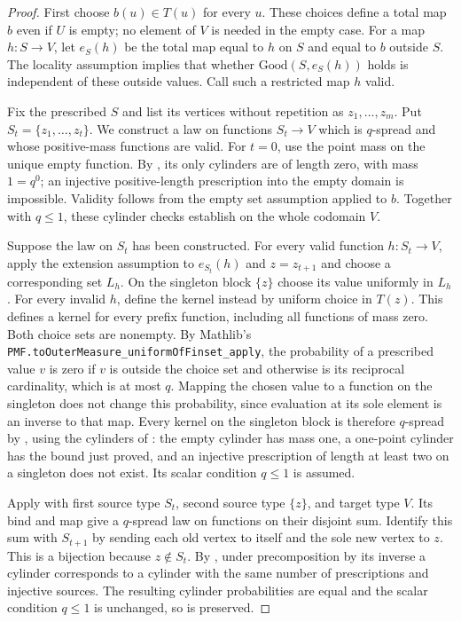 \begin{proof}
First choose $b(u)\in T(u)$ for every $u$. These choices define a total
map $b$ even if $U$ is empty; no element of $V$ is needed in the empty
case. For a map $h:S\to V$, let $e_S(h)$ be the total map equal to
$h$ on $S$ and equal to $b$ outside $S$. The locality assumption
implies that whether $\mathrm{Good}(S,e_S(h))$ holds is independent
of these outside values. Call such a restricted map $h$ valid.

Fix the prescribed $S$ and list its vertices without repetition as
$z_1,\ldots,z_m$. Put $S_t=\{z_1,\ldots,z_t\}$.
We construct a law on functions $S_t\to V$ which is $q$-spread and
whose positive-mass functions are valid. For $t=0$, use the point
mass on the unique empty function. By , its
only cylinders are of length zero, with mass $1=q^0$; an injective
positive-length prescription into the empty domain is impossible.
Validity follows from the empty
set assumption applied to $b$. Together with $q\leq1$, these cylinder
checks establish  on the whole codomain $V$.

Suppose the law on $S_t$ has been constructed. For every valid
function $h:S_t\to V$, apply the extension assumption to
$e_{S_t}(h)$ and $z=z_{t+1}$ and choose a corresponding set $L_h$.
On the singleton block $\{z\}$ choose its value uniformly in $L_h$.
For every invalid $h$, define the kernel instead by uniform choice
in $T(z)$. This defines a kernel for every prefix function, including
all functions of mass zero. Both choice sets are nonempty. By
Mathlib's \texttt{PMF.toOuterMeasure\_uniformOfFinset\_apply}, the probability of a prescribed
value $v$ is zero if $v$ is outside the choice set and otherwise is
its reciprocal cardinality, which is at most $q$. Mapping the chosen
value to a function on the singleton does not change this probability,
since evaluation at its sole element is an inverse to that map.
Every kernel on the singleton block is therefore $q$-spread by
, using the cylinders of :
the empty cylinder has mass one, a one-point cylinder has the bound
just proved, and an injective prescription of length at least two on
a singleton does not exist. Its scalar condition $q\leq1$ is assumed.

Apply  with first source type $S_t$,
second source type $\{z\}$, and target type $V$. Its bind and map
give a $q$-spread law on functions on their disjoint sum. Identify this
sum with $S_{t+1}$ by sending each old vertex to itself and the sole
new vertex to $z$. This is a bijection because $z\notin S_t$. By
, under precomposition by its inverse a cylinder
corresponds to a cylinder with the same number of prescriptions and
injective sources. The resulting cylinder probabilities are equal and
the scalar condition $q\leq1$ is unchanged, so
 is preserved.


\end{proof}
